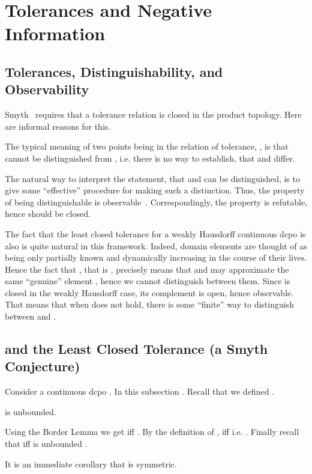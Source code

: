 \section{Tolerances and Negative Information}\label{sec:smyth}

\subsection{Tolerances, Distinguishability, and Observability}

Smyth~\cite{Smyth2} requires that a tolerance relation is closed
in the product topology. Here are informal reasons for this.

The typical meaning of two points being in the relation of tolerance,
, is that  cannot be distinguished from , i.e.
there is no way to establish, that  and  differ.

The natural way to interpret the statement, that  and  can
be distinguished, is to give some ``effective'' procedure for
making such a distinction. Thus, the property of being distinguishable
is observable~\cite{Smyth}. Correspondingly, the property 
is refutable, hence  should be closed.

The fact that the least closed tolerance for a weakly Hausdorff
continuous dcpo is  also is quite natural in this framework.
Indeed, domain elements are thought of as being only partially known
and dynamically increasing in the course of their lives. Hence the
fact that , that is , precisely means that  and  may approximate the
same ``genuine'' element , hence we cannot distinguish between them.
Since  is closed in the weakly Hausdorff case, its complement
is open, hence observable. That means that when  does
not hold, there is some ``finite'' way to distinguish between  and
.

\subsection{ and the Least Closed Tolerance (a Smyth Conjecture)}

Consider a continuous dcpo . In this subsection .
Recall that we defined
.

\begin{Lemma}
 is unbounded.
\end{Lemma}

\Proof
Using the Border Lemma we get  iff .  By the definition of ,  iff  i.e. .  
Finally recall that  iff  is unbounded .
\eproof

It is an immediate corollary
that  is symmetric. 

